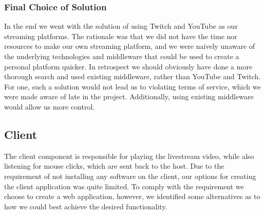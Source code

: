 \subsubsection{Final Choice of Solution}
\label{par:stream_dist_final}
In the end we went with the solution of using Twitch and YouTube as our streaming platforms. The rationale was that we did not have the time nor resources to make our own streaming platform, and we were naively unaware of the underlying technologies and middleware that could be used to create a personal platform quicker. In retrospect we should obviously have done a more thorough search and used existing middleware, rather than YouTube and Twitch. For one, such a solution would not lead us to violating terms of service\cite[5.1 G]{youtube_guidelines}, which we were made aware of late in the project. Additionally, using existing middleware would allow us more control. 























\subsection{Client} %
The client component is responsible for playing the livestream video, while also listening for mouse clicks, which are sent back to the host.
Due to the requirement of not installing any software on the client, our options for creating the client application was quite limited. 
To comply with the requirement we choose to create a web application, however, we identified some alternatives as to how we could best achieve the desired functionality.

